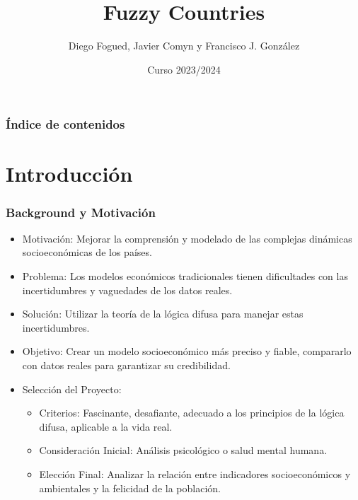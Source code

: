 \documentclass{beamer}
\title{Fuzzy Countries}
\author{Diego Fogued, Javier Comyn y Francisco J. González}
\institute{Universidad Politécnica de Madrid}
\date{Curso 2023/2024}
\begin{document}
\frame{\titlepage}

\begin{frame}
\frametitle{Índice de contenidos}
\tableofcontents
\end{frame}

\section{Introducción}
\begin{frame}
\frametitle{Background y Motivación}

\begin{itemize}
    \item Motivación: Mejorar la comprensión y modelado de las complejas dinámicas socioeconómicas de los países.
    \item Problema: Los modelos económicos tradicionales tienen dificultades con las incertidumbres y vaguedades de los datos reales.
    \item Solución: Utilizar la teoría de la lógica difusa para manejar estas incertidumbres.
    \item Objetivo: Crear un modelo socioeconómico más preciso y fiable, compararlo con datos reales para garantizar su credibilidad.
    \item Selección del Proyecto:
    \begin{itemize}
        \item Criterios: Fascinante, desafiante, adecuado a los principios de la lógica difusa, aplicable a la vida real.
        \item Consideración Inicial: Análisis psicológico o salud mental humana.
        \item Elección Final: Analizar la relación entre indicadores socioeconómicos y ambientales y la felicidad de la población.
    \end{itemize}
\end{itemize}

\end{frame}
\end{document}
